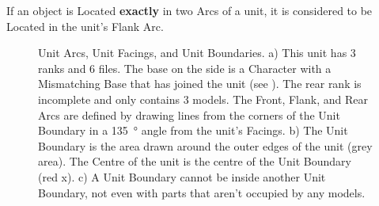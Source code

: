 If an object is Located \textbf{exactly} in two Arcs of a unit, it is considered to be Located in the unit's Flank Arc.

\newcommand{\ARCSa}{a)}
\newcommand{\ARCSb}{b)}
\newcommand{\ARCSc}{c)}

\newcommand{\frontarc}{\normalfontsize{}Front Arc}
\newcommand{\leftflankarc}{%
\begin{minipage}{0.06\unitlength}\begin{center}%
\normalfontsize{}Left Flank Arc%
\end{center}\end{minipage}}
\newcommand{\rightflankarc}{%
\begin{minipage}{0.06\unitlength}\begin{center}%
\normalfontsize{}Right Flank Arc%
\end{center}\end{minipage}}
\newcommand{\reararc}{\normalfontsize{}Rear Arc}
\newcommand{\firstangle}{\normalfontsize{}\SI{90}{\degree}}
\newcommand{\secondangle}{\normalfontsize{}\SI{135}{\degree}}

\newcommand{\frontfacing}{\normalfontsize{}Front Facing}
\newcommand{\leftflankfacing}{%
\begin{minipage}{0.06\unitlength}\begin{center}%
\normalfontsize{}Left Flank Facing%
\end{center}\end{minipage}}
\newcommand{\rightflankfacing}{%
\begin{minipage}{0.06\unitlength}\begin{center}%
\normalfontsize{}Right Flank Facing%
\end{center}\end{minipage}}
\newcommand{\rearfacing}{\normalfontsize{}Rear Facing}
\newcommand{\centreofunit}{\normalfontsize{}Centre of Unit}

\begin{figure}[!htbp]
	\renewcommand{\figbiglettersize}{17}
	\centering
	\def\svgwidth{\textwidth}
	
	\caption{%
	Unit Arcs, Unit Facings, and Unit Boundaries.\captionpar
	a) This unit has 3 ranks and 6 files. The base on the side is a Character with a Mismatching Base that has joined the unit (see ). The rear rank is incomplete and only contains 3 models.\captionpar
	The Front, Flank, and Rear Arcs are defined by drawing lines from the corners of the Unit Boundary in a \SI{135}{\degree} angle from the unit's Facings.\captionpar
	b) The Unit Boundary is the area drawn around the outer edges of the unit (grey area). The Centre of the unit is the centre of the Unit Boundary (red x).\captionpar
	c) A Unit Boundary cannot be inside another Unit Boundary, not even with parts that aren't occupied by any models.%
	}
	\label{figure/arcs}
\end{figure}


